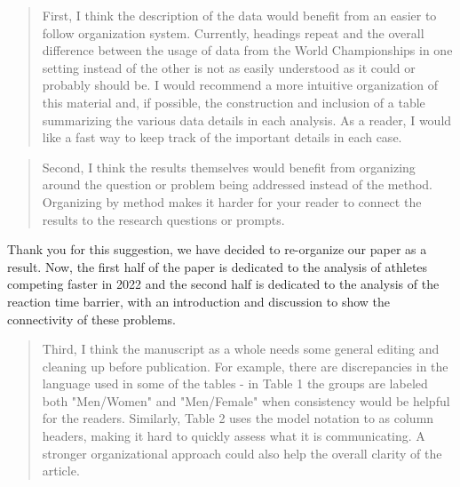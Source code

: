 \documentclass[12pt]{article}
\newenvironment{comment}%
{\begin{quotation}\noindent\small\it\color{darkblue}\ignorespaces%
}{\end{quotation}}
\begin{document}
\begin{comment}
First, I think the description of the data would benefit from an easier to
follow organization system. Currently, headings repeat and the overall
difference between the usage of data from the World Championships in one setting
instead of the other is not as easily understood as it could or probably should
be. I would recommend a more intuitive organization of this material and, if
possible, the construction and inclusion of a table summarizing the various data
details in each analysis. As a reader, I would like a fast way to keep track of
the important details in each case.
\end{comment}




\begin{comment}
Second, I think the results themselves would benefit from organizing around the
question or problem being addressed instead of the method. Organizing by method
makes it harder for your reader to connect the results to the research questions
or prompts.
\end{comment}

Thank you for this suggestion, we have decided to re-organize our paper as a
result. Now, the first half of the paper is dedicated to the analysis of
athletes competing faster in 2022 and the second half is dedicated to the
analysis of the reaction time barrier, with an introduction and discussion to
show the connectivity of these problems.



\begin{comment}
Third, I think the manuscript as a whole needs some general editing and cleaning
up before publication. For example, there are discrepancies in the language used
in some of the tables - in Table 1 the groups are labeled both "Men/Women" and
"Men/Female" when consistency would be helpful for the readers. Similarly, Table
2 uses the model notation to as column headers, making it hard to quickly assess
what it is communicating. A stronger organizational approach could also help the
overall clarity of the article.
\end{comment}
\end{document}
